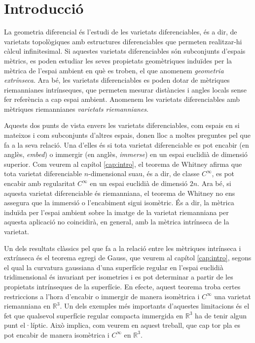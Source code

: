\chapter{Introducci\'o}

La geometria diferencial és l'estudi de les varietats diferenciables, és a dir, de varietats topològiques amb estructures diferenciables que permeten realitzar-hi càlcul infinitesimal. Si aquestes varietats diferenciables són subconjunts d'espais mètrics, es poden estudiar les seves propietats geomètriques induïdes per la mètrica de l'espai ambient en què es troben, el que anomenem \textit{geometria extrínseca}. Ara bé, les varietats diferenciables es poden dotar de mètriques riemannianes intrínseques, que permeten mesurar distàncies i angles locals sense fer referència a cap espai ambient. Anomenem les varietats diferenciables amb mètriques riemannianes \textit{varietats riemannianes}.

Aquests dos punts de vista envers les varietats diferenciables, com espais en si mateixos i com subconjunts d'altres espais, donen lloc a moltes preguntes pel que fa a la seva relació. Una d'elles és si tota varietat diferenciable es pot encabir (en anglès, \textit{embed}) o immergir (en anglès, \textit{immerse}) en un espai euclidià de dimensió superior. Com veurem al capítol \ref{cap:intro}, el teorema de Whitney afirma que tota varietat diferenciable $n$-dimensional suau, és a dir, de classe $C^\infty$, es pot encabir amb regularitat $C^\infty$ en un espai euclidià de dimensió $2n$. Ara bé, si aquesta varietat diferenciable és riemanniana, el teorema de Whitney no ens assegura que la immersió o l'encabiment sigui isomètric. És a dir, la mètrica induïda per l'espai ambient sobre la imatge de la varietat riemanniana per aquesta aplicació no coincidirà, en general, amb la mètrica intrínseca de la varietat. 

Un dels resultats clàssics pel que fa a la relació entre les mètriques intrínseca i extrínseca és el teorema egregi de Gauss, que veurem al capítol \ref{cap:intro}, segons el qual la curvatura gaussiana d'una superfície regular en l'espai euclidià tridimensional és invariant per isometries i es pot determinar a partir de les propietats intrínseques de la superfície. En efecte, aquest teorema troba certes restriccions a l'hora d'encabir o immergir de manera isomètrica i $C^\infty$ una varietat riemanniana en $\mathbb R^3$. Un dels exemples més importants d'aquestes limitacions és el fet que qualsevol superfície regular compacta immergida en $\mathbb R^3$ ha de tenir algun punt el·líptic. Això implica, com veurem en aquest treball, que cap tor pla es pot encabir de manera isomètrica i $C^\infty$ en $\mathbb R^3$.

